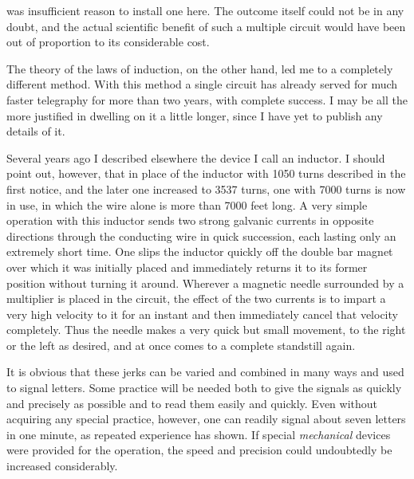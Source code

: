 was insufficient reason to install one here. The outcome itself could not be in any doubt, and the actual scientific benefit of such a multiple circuit would have been out of proportion to its considerable cost.

The theory of the laws of induction, on the other hand, led me to a completely different method. With this method a single circuit has already served for much faster telegraphy for more than two years, with complete success. I may be all the more justified in dwelling on it a little longer, since I have yet to publish any details of it.

Several years ago I described elsewhere the device I call an inductor{\renewcommand{\thefootnote}{**)}}. I should point out, however, that in place of the inductor with 1050 turns described in the first notice, and the later one increased to 3537 turns, one with 7000 turns is now in use, in which the wire alone is more than 7000 feet long. A very simple operation with this inductor sends two strong galvanic currents in opposite directions through the conducting wire in quick succession, each lasting only an extremely short time. One slips the inductor quickly off the double bar magnet over which it was initially placed and immediately returns it to its former position without turning it around. Wherever a magnetic needle surrounded by a multiplier is placed in the circuit, the effect of the two currents is to impart a very high velocity to it for an instant and then immediately cancel that velocity completely. Thus the needle makes a very quick but small movement, to the right or the left as desired, and at once comes to a complete standstill again.

It is obvious that these jerks can be varied and combined in many ways and used to signal letters. Some practice will be needed both to give the signals as quickly and precisely as possible and to read them easily and quickly. Even without acquiring any special practice, however, one can readily signal about seven letters in one minute, as repeated experience has shown. If special \textit{mechanical} devices were provided for the operation, the speed and precision could undoubtedly be increased considerably.

